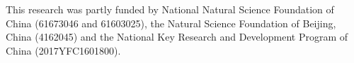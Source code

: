 This research was partly funded by National Natural Science Foundation of China (61673046 and 61603025), the Natural Science Foundation of Beijing, China (4162045) and the National Key Research and Development Program of China (2017YFC1601800). 